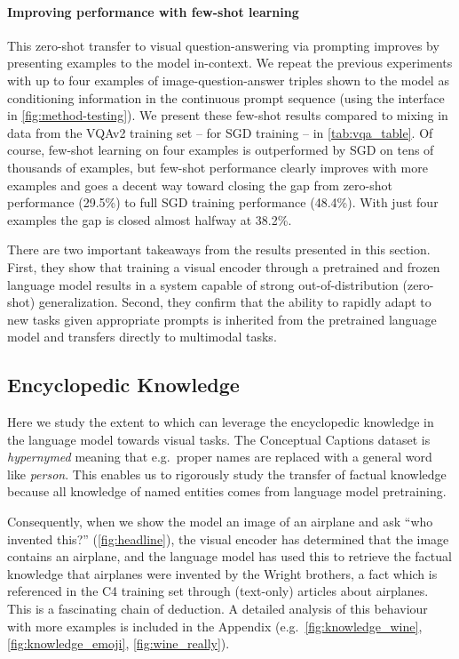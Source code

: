 \paragraph{Improving performance with few-shot learning}

This zero-shot transfer to visual question-answering via prompting improves by presenting examples to the model in-context. We repeat the previous experiments with up to four examples of image-question-answer triples shown to the model as conditioning information in the continuous prompt sequence (using the interface in \autoref{fig:method-testing}).  We present these few-shot results compared to mixing in data from the VQAv2 training set -- for SGD training -- in \autoref{tab:vqa_table}. Of course, few-shot learning on four examples is outperformed by SGD on tens of thousands of examples, but few-shot performance clearly improves with more examples and goes a decent way toward closing the gap from zero-shot performance (29.5\%) to full SGD training performance (48.4\%). With just four examples the gap is closed almost halfway at 38.2\%.

There are two important takeaways from the results presented in this section. First, they show that training a visual encoder through a pretrained and frozen language model results in a system capable of strong out-of-distribution (zero-shot) generalization. Second, they confirm that the ability to rapidly adapt to new tasks given appropriate prompts is inherited from the pretrained language model and transfers directly to multimodal tasks.

\subsection{Encyclopedic Knowledge}\label{sec:encyc_knowledge}

Here we study the extent to which \Model can leverage the encyclopedic knowledge in the language model towards visual tasks. The Conceptual Captions dataset is \emph{hypernymed} meaning that e.g.\ proper names are replaced with a general word like {\it person}. This enables us to rigorously study the transfer of factual knowledge because all knowledge of named entities comes from language model pretraining.

Consequently, when we show the model an image of an airplane and ask ``who invented this?'' (\autoref{fig:headline}), the visual encoder has determined that the image contains an airplane, and the language model has used this to retrieve the factual knowledge that airplanes were invented by the Wright brothers, a fact which is referenced in the C4 training set through (text-only) articles about airplanes. This is a fascinating chain of deduction. A detailed analysis of this behaviour with more examples is included in the Appendix (e.g.\ \autoref{fig:knowledge_wine}, \autoref{fig:knowledge_emoji}, \autoref{fig:wine_really}).

